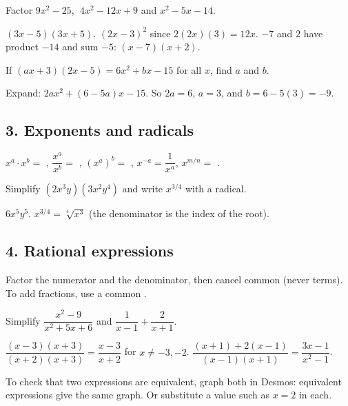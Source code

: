 Factor $9x^2-25$, $\;4x^2-12x+9$ and $x^2-5x-14$.
\begin{workspace}[2.4cm]
$(3x-5)(3x+5)$. \quad $(2x-3)^2$ since $2(2x)(3)=12x$. \quad $-7$ and $2$ have product $-14$ and sum $-5$: $(x-7)(x+2)$.
\end{workspace}

If $(ax+3)(2x-5)=6x^2+bx-15$ for all $x$, find $a$ and $b$.
\begin{workspace}[2.2cm]
Expand: $2ax^2+(6-5a)x-15$. So $2a=6$, $a=3$, and $b=6-5(3)=-9$.
\end{workspace}

\subsection*{3. Exponents and radicals}
\begin{keyidea}
$x^a\cdot x^b=$ , \quad $\dfrac{x^a}{x^b}=$ , \quad $(x^a)^b=$ , \quad $x^{-a}=\dfrac{1}{x^a}$, \quad $x^{m/n}=$ .
\end{keyidea}

Simplify $(2x^3y)(3x^2y^4)$ and write $x^{3/4}$ with a radical.
\begin{workspace}[1.8cm]
$6x^5y^5$. \quad $x^{3/4}=\sqrt[4]{x^3}$ (the denominator is the index of the root).
\end{workspace}

\subsection*{4. Rational expressions}
\begin{keyidea}
Factor the numerator and the denominator, then cancel common  (never terms). To add fractions, use a common .
\end{keyidea}

Simplify $\dfrac{x^2-9}{x^2+5x+6}$ and $\dfrac{1}{x-1}+\dfrac{2}{x+1}$.
\begin{workspace}[2.6cm]
$\dfrac{(x-3)(x+3)}{(x+2)(x+3)}=\dfrac{x-3}{x+2}$ for $x\neq-3,-2$. \quad $\dfrac{(x+1)+2(x-1)}{(x-1)(x+1)}=\dfrac{3x-1}{x^2-1}$.
\end{workspace}

\begin{aptip}
To check that two expressions are equivalent, graph both in Desmos: equivalent expressions give the same graph. Or substitute a value such as $x=2$ in each.
\end{aptip}


